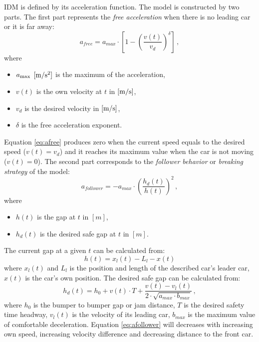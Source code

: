 \documentclass[a4paper,12pt,twoside]{report}
\begin{document}
			IDM is defined by its acceleration function. The model is constructed by two parts. The first part represents the \textit{free acceleration} when there is no leading car or it is far away:
			\begin{equation}
				a_{free}=a_{max}\cdot \left [ 1 - \left ( \frac{v(t)}{v_d} \right )^\delta \right ]\,,
				\label{eq:afree}
			\end{equation}
			where
			\begin{itemize}
				\item $a_{\rm max}$ $\rm [m/s^2]$ is the maximum of the acceleration,
				\item $v(t)$ is the own velocity at $t$ in $\rm [m/s]$,
				\item $v_d$ is the desired velocity in $\rm [m/s]$,
				\item $\delta$ is the free acceleration exponent.
			\end{itemize}
			Equation \ref{eq:afree} produces zero when the current speed equals to the desired speed ($v(t)=v_d$) and it reaches its maximum value when the car is not moving ($v(t)=0$).
			The second part corresponds to the \textit{follower behavior} or \textit{breaking strategy} of the model:
			\begin{equation}
				a_{follower}=-a_{max}\cdot \left ( \frac{h_d(t)}{h(t)} \right )^2\,,
				\label{eq:afollower}
			\end{equation}
			where
			\begin{itemize}
				\item $h(t)$ is the gap at $t$ in $[m]$,
				\item $h_d(t)$ is the desired safe gap at $t$ in $[m]$.
			\end{itemize}
			The current gap at a given $t$ can be calculated from:
			\begin{equation}
				h(t)=x_l(t)-L_l - x(t)
			\end{equation}
			where $x_l(t)$ and $L_l$ is the position and length of the described car's leader car, $x(t)$ is the car's own position.
			The desired safe gap can be calculated from:
			\begin{equation}
				h_d(t)=h_0 + v(t)\cdot T + \frac{v(t)-v_l(t)}{2\cdot \sqrt{a_{max}\cdot b_{max}}}\,,
			\end{equation}
			where $h_0$ is the bumper to bumper gap or jam distance, $T$ is the desired safety time headway, $v_l(t)$ is the velocity of its leading car, $b_{max}$ is the maximum value of comfortable deceleration.
			Equation \ref{eq:afollower} will decreases with increasing own speed, increasing velocity difference and decreasing distance to the front car.
\end{document}
